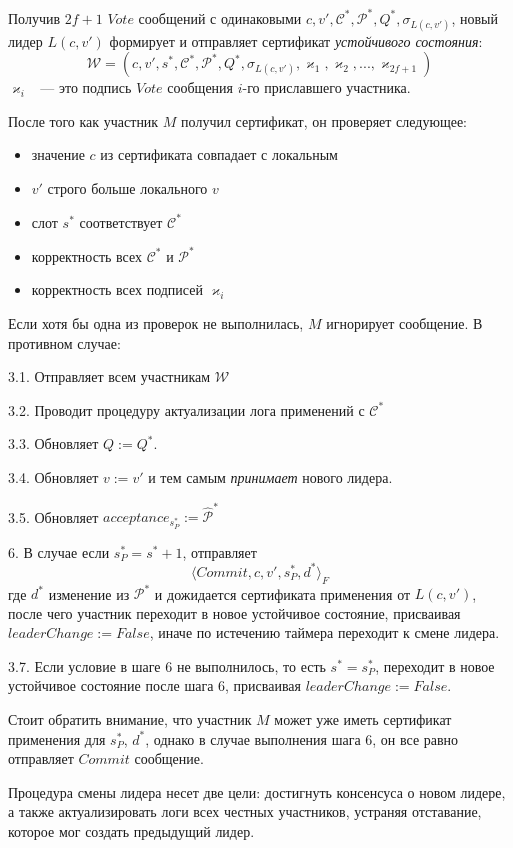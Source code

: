Получив $2f+1$ $Vote$ сообщений с одинаковыми $c, v', \mathcal{C}^{*}, \mathcal{P}^{*}, Q^{*}, \sigma_{L(c, v')}$, новый лидер $L(c, v')$ формирует и отправляет сертификат \textit{устойчивого состояния}:
$$\mathcal{W}=(c, v', s^{*}, \mathcal{C}^{*}, \mathcal{P}^{*}, Q^{*}, \sigma_{L(c, v')}, \varkappa_1, \varkappa_2,..., \varkappa_{2f+1})$$
$\varkappa_i$ ~--- это подпись $Vote$ сообщения $i$-го приславшего участника.

После того как участник $M$ получил сертификат, он проверяет следующее:
\begin{itemize}
\item значение $c$ из сертификата совпадает с локальным
\item $v'$ строго больше локального $v$
\item слот $s^{*}$ соответствует $\mathcal{C}^{*}$
\item корректность всех $\mathcal{C}^{*}$ и $\mathcal{P}^{*}$
\item корректность всех подписей $\varkappa_i$
\end{itemize}
Если хотя бы одна из проверок не выполнилась, $M$ игнорирует сообщение. В противном случае:

3.1. Отправляет всем участникам $\mathcal{W}$

3.2. Проводит процедуру актуализации лога применений с $\mathcal{C}^{*}$

3.3. Обновляет $Q := Q^{*}$.

3.4. Обновляет $v := v'$ и тем самым \textit{принимает} нового лидера.

3.5. Обновляет $acceptance_{s_P^{*}} := \hat{\mathcal{P}}^{*}$

6. В случае если $s_P^{*}=s^{*}+1$, отправляет
\[ \langle Commit, c, v', s_P^{*}, d^{*} \rangle_F \]
где $d^{*}$ изменение из $\mathcal{P}^{*}$ и дожидается сертификата применения от $L(c, v')$, после чего участник переходит в новое устойчивое состояние, присваивая $leaderChange := False$, иначе по истечению таймера переходит к смене лидера.

3.7. Если условие в шаге 6 не выполнилось, то есть $s^{*}=s_P^{*}$, переходит в новое устойчивое состояние после шага 6, присваивая $leaderChange := False$.

Стоит обратить внимание, что участник $M$ может уже иметь сертификат применения для $s_P^{*}$, $d^{*}$, однако в случае выполнения  шага 6, он все равно отправляет $Commit$ сообщение.

Процедура смены лидера несет две цели: достигнуть консенсуса о новом лидере, а также актуализировать логи всех честных участников, устраняя отставание, которое мог создать предыдущий лидер.

